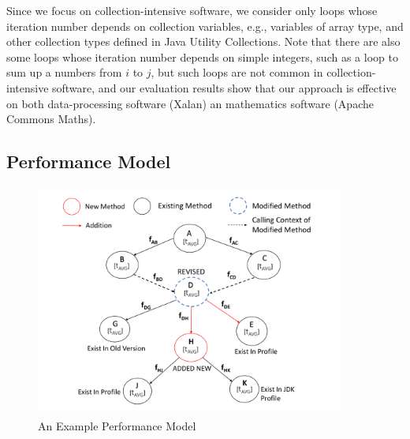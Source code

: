 




Since we focus on collection-intensive software, we consider only loops whose iteration number depends on collection variables, e.g., variables of array type, and other collection types defined in Java Utility Collections. Note that there are also some loops whose iteration number depends on simple integers, such as a loop to sum up a numbers from $i$ to $j$, but such loops are not common in collection-intensive software, and our evaluation results show that our approach is effective on both data-processing software (Xalan) an mathematics software (Apache Commons Maths). 



  
\subsection{Performance Model}
\label{subsec:model}
\begin{figure}[t]
\centering
  \includegraphics[width=4in, height=3in]{performance/images/performance-model.pdf}
  
   \caption{An Example Performance Model}	
    \label{fig:performance-model}
   
 \end{figure}

